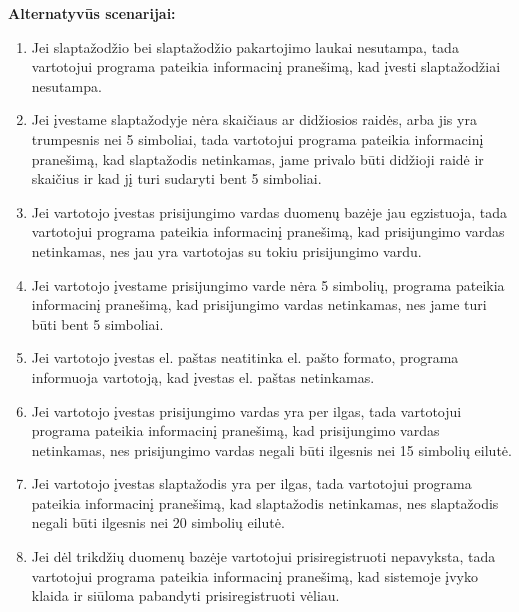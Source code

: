 \documentclass{VUMIFPSkursinis}
\begin{document}
	\textbf{Alternatyvūs scenarijai:}
	\begin{enumerate}
		\item Jei slaptažodžio bei slaptažodžio pakartojimo laukai nesutampa, tada vartotojui programa pateikia informacinį pranešimą, kad įvesti slaptažodžiai nesutampa.
		\item Jei įvestame slaptažodyje nėra skaičiaus ar didžiosios raidės, arba jis yra trumpesnis nei 5 simboliai, tada vartotojui programa pateikia informacinį pranešimą, kad slaptažodis netinkamas, jame privalo būti didžioji raidė ir skaičius ir kad jį turi sudaryti bent 5 simboliai.
		\item Jei vartotojo įvestas prisijungimo vardas duomenų bazėje jau egzistuoja, tada vartotojui programa pateikia informacinį pranešimą, kad prisijungimo vardas netinkamas, nes jau yra vartotojas su tokiu prisijungimo vardu.
		\item Jei vartotojo įvestame prisijungimo varde nėra 5 simbolių, programa pateikia informacinį pranešimą, kad prisijungimo vardas netinkamas, nes jame turi būti bent 5 simboliai.
		\item Jei vartotojo įvestas el. paštas neatitinka el. pašto formato, programa informuoja vartotoją, kad įvestas el. paštas netinkamas.
		\item Jei vartotojo įvestas prisijungimo vardas yra per ilgas, tada vartotojui programa pateikia informacinį pranešimą, kad prisijungimo vardas netinkamas, nes prisijungimo vardas negali būti ilgesnis nei 15 simbolių eilutė.
		\item Jei  vartotojo įvestas slaptažodis yra per ilgas, tada vartotojui programa pateikia informacinį pranešimą, kad slaptažodis netinkamas, nes slaptažodis negali būti ilgesnis nei 20 simbolių eilutė.
		\item Jei dėl trikdžių duomenų bazėje vartotojui prisiregistruoti nepavyksta, tada vartotojui programa pateikia informacinį pranešimą, kad sistemoje įvyko klaida ir siūloma pabandyti prisiregistruoti vėliau.
	\end{enumerate} 
\end{document}
